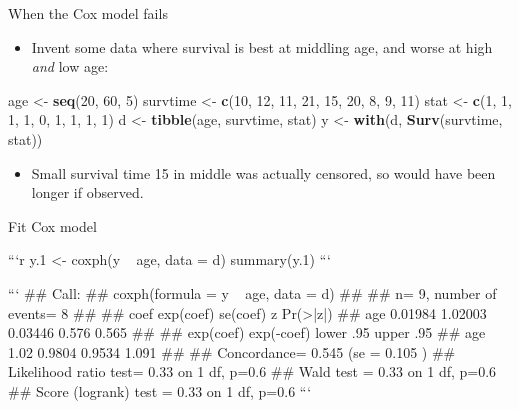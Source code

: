 \documentclass[ignorenonframetext,]{beamer}
\newenvironment{Shaded}{\begin{snugshade}}{\end{snugshade}}
\newcommand{\DecValTok}[1]{\textcolor[rgb]{0.00,0.00,0.81}{#1}}
\newcommand{\KeywordTok}[1]{\textcolor[rgb]{0.13,0.29,0.53}{\textbf{#1}}}
\newcommand{\NormalTok}[1]{#1}
\newcommand{\StringTok}[1]{\textcolor[rgb]{0.31,0.60,0.02}{#1}}
\providecommand{\tightlist}{%
  \setlength{\itemsep}{0pt}\setlength{\parskip}{0pt}}
\begin{document}
\begin{frame}[fragile]{When the Cox model fails}
\protect\hypertarget{when-the-cox-model-fails}{}

\begin{itemize}
\tightlist
\item
  Invent some data where survival is best at middling age, and worse at
  high \emph{and} low age:
\end{itemize}

\begin{Shaded}
\begin{Highlighting}[]
\NormalTok{age <-}\StringTok{ }\KeywordTok{seq}\NormalTok{(}\DecValTok{20}\NormalTok{, }\DecValTok{60}\NormalTok{, }\DecValTok{5}\NormalTok{)}
\NormalTok{survtime <-}\StringTok{ }\KeywordTok{c}\NormalTok{(}\DecValTok{10}\NormalTok{, }\DecValTok{12}\NormalTok{, }\DecValTok{11}\NormalTok{, }\DecValTok{21}\NormalTok{, }\DecValTok{15}\NormalTok{, }\DecValTok{20}\NormalTok{, }\DecValTok{8}\NormalTok{, }\DecValTok{9}\NormalTok{, }\DecValTok{11}\NormalTok{)}
\NormalTok{stat <-}\StringTok{ }\KeywordTok{c}\NormalTok{(}\DecValTok{1}\NormalTok{, }\DecValTok{1}\NormalTok{, }\DecValTok{1}\NormalTok{, }\DecValTok{1}\NormalTok{, }\DecValTok{0}\NormalTok{, }\DecValTok{1}\NormalTok{, }\DecValTok{1}\NormalTok{, }\DecValTok{1}\NormalTok{, }\DecValTok{1}\NormalTok{)}
\NormalTok{d <-}\StringTok{ }\KeywordTok{tibble}\NormalTok{(age, survtime, stat)}
\NormalTok{y <-}\StringTok{ }\KeywordTok{with}\NormalTok{(d, }\KeywordTok{Surv}\NormalTok{(survtime, stat))}
\end{Highlighting}
\end{Shaded}

\begin{itemize}
\tightlist
\item
  Small survival time 15 in middle was actually censored, so would have
  been longer if observed.
\end{itemize}

\end{frame}

\begin{frame}{Fit Cox model}
\protect\hypertarget{fit-cox-model}{}

\begin{footnotesize}

```r
y.1 <- coxph(y ~ age, data = d)
summary(y.1)
```

```
## Call:
## coxph(formula = y ~ age, data = d)
## 
##   n= 9, number of events= 8 
## 
##        coef exp(coef) se(coef)     z Pr(>|z|)
## age 0.01984   1.02003  0.03446 0.576    0.565
## 
##     exp(coef) exp(-coef) lower .95 upper .95
## age      1.02     0.9804    0.9534     1.091
## 
## Concordance= 0.545  (se = 0.105 )
## Likelihood ratio test= 0.33  on 1 df,   p=0.6
## Wald test            = 0.33  on 1 df,   p=0.6
## Score (logrank) test = 0.33  on 1 df,   p=0.6
```

   
\end{footnotesize}

\end{frame}
\end{document}
